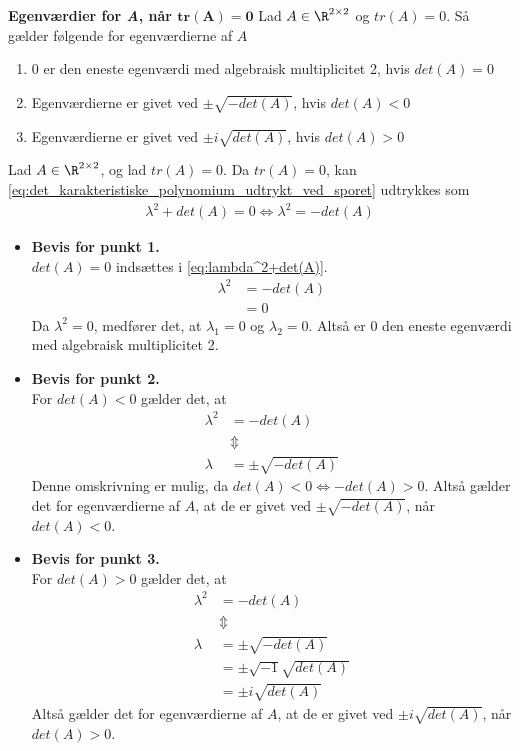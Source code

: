 \begin{thmx} \textbf{Egenværdier for \textit{A}, når $\bm{tr(A)=0}$} \label{sæt:egenværdier_og_spor}%
\newline
Lad $A\in \R^{2 \times 2}$ og $tr(A)=0$. Så gælder følgende for egenværdierne af $A$
\begin{enumerate}
    \item 0 er den eneste egenværdi med algebraisk multiplicitet 2, hvis $det(A)=0$
    \item Egenværdierne er givet ved $\pm\sqrt{-det(A)}$, hvis $det(A)<0$
    \item Egenværdierne er givet ved $\pm i\sqrt{det(A)}$, hvis $det(A)>0$
\end{enumerate}
\end{thmx}

\begin{bev} \textbf{} %
\newline
Lad $A\in \R^{2 \times 2}$, og lad $tr(A)=0$. Da $tr(A)=0$, kan \eqref{eq:det_karakteristiske_polynomium_udtrykt_ved_sporet} udtrykkes som 
\begin{align} \label{eq:lambda^2+det(A)}
    \lambda^2+det(A)=0 \Leftrightarrow \lambda^2=-det(A)
\end{align}
\begin{itemize}
    \item [] \textbf{Bevis for punkt 1.}\\
    $det(A)=0$ indsættes i \eqref{eq:lambda^2+det(A)}.
    \begin{align*}
        \lambda^2&=-det(A)\\
        &=0
    \end{align*}
    Da $\lambda^2=0$, medfører det, at $\lambda_1=0$ og $\lambda_2=0$. Altså er 0 den eneste egenværdi med algebraisk multiplicitet 2. 
    \item [] \textbf{Bevis for punkt 2.}\\
    For $det(A) < 0$ gælder det, at 
    \begin{align*}
        \lambda^2 &= -det(A)\\
        &\Updownarrow\\
        \lambda &= \pm \sqrt{-det(A)}
    \end{align*}
    Denne omskrivning er mulig, da $det(A)<0 \Leftrightarrow -det(A)>0$. Altså gælder det for egenværdierne af $A$, at de er givet ved $\pm \sqrt{-det(A)}$, når $det(A)<0$.
    \item [] \textbf{Bevis for punkt 3.}\\
    For $det(A) > 0$ gælder det, at
    \begin{align*}
        \lambda^2 &= -det(A)\\
        &\Updownarrow\\
        \lambda &= \pm \sqrt{-det(A)}\\
        &= \pm\sqrt{-1}\sqrt{det(A)}\\
        &= \pm i\sqrt{det(A)}
    \end{align*}
    Altså gælder det for egenværdierne af $A$, at de er givet ved $\pm i\sqrt{det(A)}$, når $det(A)>0$.
\end{itemize}
\end{bev}

